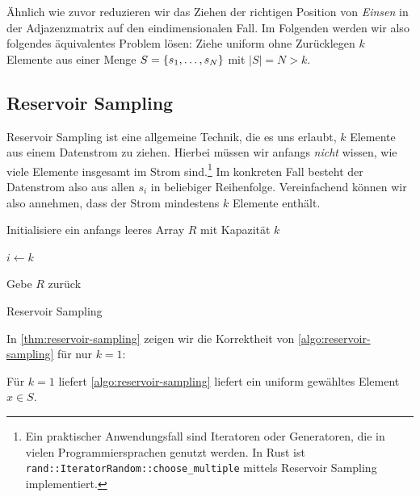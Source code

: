 Ähnlich wie zuvor reduzieren wir das Ziehen der richtigen Position von \emph{Einsen} in der Adjazenzmatrix auf den eindimensionalen Fall.
Im Folgenden werden wir also folgendes äquivalentes Problem lösen:
Ziehe uniform ohne Zurücklegen $k$ Elemente aus einer Menge $S = \left\{s_1, \ldots, s_N\right\}$ mit $|S| = N > k$.

\subsection{Reservoir Sampling}
Reservoir Sampling ist eine allgemeine Technik, die es uns erlaubt, $k$ Elemente aus einem Datenstrom zu ziehen.
Hierbei müssen wir anfangs \emph{nicht} wissen, wie viele Elemente insgesamt im Strom sind.\footnote{
    Ein praktischer Anwendungsfall sind \zB Iteratoren oder Generatoren, die in vielen Programmiersprachen genutzt werden.
    In Rust ist \zB \texttt{rand::IteratorRandom::choose\_multiple} mittels Reservoir Sampling implementiert.
}
Im konkreten Fall besteht der Datenstrom also aus allen $s_i$ in beliebiger Reihenfolge.
Vereinfachend können wir also annehmen, dass der Strom mindestens $k$ Elemente enthält.

\begin{algorithm}[H]

    Initialisiere ein anfangs leeres Array $R$ mit Kapazität $k$\;


    $i \gets k$\;

    Gebe $R$ zurück

    \caption{Reservoir Sampling}
    \label{algo:reservoir-sampling}
\end{algorithm}

\bigskip
\bigskip

\noindent
In \cref{thm:reservoir-sampling} zeigen wir die Korrektheit von \cref{algo:reservoir-sampling} für nur $k = 1$:
\begin{theorem}\label{thm:reservoir-sampling}
    Für $k=1$ liefert \cref{algo:reservoir-sampling} liefert ein uniform gewähltes Element $x\in S$.
\end{theorem}


